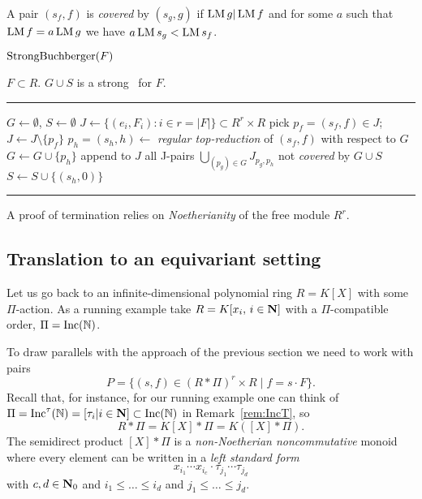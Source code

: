 A pair $(s_f,f)$ is {\em covered} by $(s_g,g)$ if $\operatorname{LM} g | \operatorname{LM} f$ and for some $a$ such that $\operatorname{LM} f = a \operatorname{LM} g$ we have $a\operatorname{LM} s_g < \operatorname{LM} s_f$. 

\begin{algorithm} \label{alg:StrongBuchberger} 
$\operatorname{StrongBuchberger}(F)$

\begin{algorithmic}[1]
\REQUIRE $F \subset R$.
\ENSURE $G \cup S$ is a strong \GB\ for $F$.
\smallskip \hrule \smallskip

\STATE $G\gets \emptyset$, $S\gets \emptyset$ 
\STATE $J\gets \{(e_i,F_i):i\in r=|F|\} \subset R^r\times R$ 
	\STATE pick $p_f = (s_f,f) \in J$; $J\gets J\setminus\{p_f\}$
	\STATE $p_h=(s_h,h) \gets$ {\em regular top-reduction} of $(s_f,f)$ with respect to $G$
		\STATE $G\gets G\cup \{p_h\}$
		\STATE append to $J$ all J-pairs $\bigcup_{(p_g)\in G}J_{p_g,p_h}$ not {\em covered} by $G \cup S$ 
        \ELSE 
                \STATE $S\gets S\cup\{(s_h,0)\}$
	\ENDIF
\ENDWHILE
\smallskip \hrule \smallskip
\end{algorithmic}
\end{algorithm}

A proof of termination relies on {\em Noetherianity} of the free module $R^r$. 

\subsection{Translation to an equivariant setting}
Let us go back to an infinite-dimensional polynomial ring $R=K[X]$ with some $\Pi$-action. As a running example take $R=K[x_i,\, i\in\mathbf N]$ with a $\Pi$-compatible order, $\Pi=\operatorname{Inc}(\mathbb N)$.

To draw parallels with the approach of the previous section we need to work with pairs 
\[
P = \{(s,f)\in (R*\Pi)^r\times R \mid f=s\cdot F\}.
\]
Recall that, for instance, for our running example one can think of $\Pi=\operatorname{Inc}^\tau(\mathbb N) = [\tau_i|i\in\mathbf N]\subset \operatorname{Inc}(\mathbb N)$ in Remark~\ref{rem:IncT}, so \[R*\Pi = K[X]*\Pi = K([X]*\Pi).\] 
The semidirect product $[X]*\Pi$ is a {\em non-Noetherian noncommutative} monoid where every element can be written in a \emph{left standard form} 
$$
x_{i_1}\cdots x_{i_c} \cdot \tau_{j_1} \cdots \tau_{j_d}
$$
with $c,d \in \mathbf N_0$ and $i_1 \leq \ldots \leq i_d$ and $j_1 \leq \ldots \leq j_d$. 

